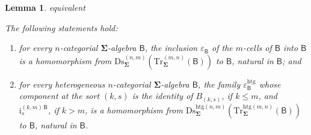 \documentclass[a4paper, reqno]{amsbook}
\makeatletter
\newcommand{\sig}[1]{\mathbf{#1}}             %
\newcommand{\calg}[1]{\boldsymbol{\mathsf{#1}}} %
\newcommand{\htg}{\mathrm{htg}}                %
\newcommand{\Ds}{\mathrm{Ds}}
\newcommand{\Tr}{\mathrm{Tr}}
\theoremstyle{plain}
\newtheorem{lemma}[theorem]{Lemma}
\theoremstyle{definition}
\newcommand*{\CA@leanpending}{}
\newcommand*{\CA@leanrelation}{}
\newcommand*{\lean}[2]{%
  \ifcsname\string\color@lean@#1\endcsname\else
    \PackageError{main}{Unknown relation `#1' in \string\lean}{Use equivalent, weaker or stronger.}%
  \fi
  \gdef\CA@leanrelation{#1}%
  \gdef\CA@leanpending{#2}}
\makeatother
\begin{document}
\begin{lemma}\label{LDsTrCounit}\lean{equivalent}{Dimensions.homogeneousCounit,Dimensions.heterogeneousCounit}
The following statements hold:
\begin{enumerate}
\item for every $n$-categorial $\sig{\Sigma}$-algebra $\calg{B}$, the inclusion $\varepsilon_{\calg{B}}$ of the $m$-cells of $\calg{B}$ into $\calg{B}$ is a homomorphism from $\Ds^{(n,m)}_{\sig{\Sigma}}(\Tr^{(m,n)}_{\sig{\Sigma}}(\calg{B}))$ to $\calg{B}$, natural in $\calg{B}$; and
\item for every heterogeneous $n$-categorial $\sig{\Sigma}$-algebra $\calg{B}$, the family $\varepsilon^{\htg}_{\calg{B}}$ whose component at the sort $(k,s)$ is the identity of $B_{(k,s)}$, if $k\leq m$, and $\mathrm{i}^{(k,m)\,\calg{B}}_{s}$, if $k>m$, is a homomorphism from $\Ds^{\htg(n,m)}_{\sig{\Sigma}}(\Tr^{\htg(m,n)}_{\sig{\Sigma}}(\calg{B}))$ to $\calg{B}$, natural in $\calg{B}$.
\end{enumerate}
\end{lemma}
\end{document}
